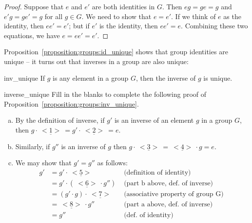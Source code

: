 \begin{proof}
Suppose that $e$ and $e'$ are both identities in $G$. Then $eg = ge =
g$ and $e'g = ge' = g$ for all $g \in G$. We need to show that $e =
e'$. If we think of $e$ as the identity, then $ee' = e'$; but if $e'$
is the identity, then $ee' = e$. Combining these two equations, we
have $e = ee' = e'$. 
\end{proof}
 
 Proposition~\ref{proposition:groups:id_unique} shows that group identities are unique -- it turns out that inverses in a group are also unique:
 
\begin{prop}{inv_unique}
If $g$ is any element in a group $G$, then the inverse of $g$  is unique. 
\end{prop}


\begin{exercise}{inverse_unique}
Fill in the blanks to complete the following proof of Proposition~\ref{proposition:groups:inv_unique}.
\begin{enumerate}[(a)]
\item
By the definition of inverse, if $g'$ is an inverse of an element $g$ in a group $G$, then 
\noindent
$g \cdot \underline{~<1>~} = g' \cdot \underline{~<2>~} = e$.

\item
Similarly, if $g''$ is an inverse of $g$ then  $g \cdot \underline{~<3>~} = \underline{~<4>~} \cdot g = e$. 
\item
We may show that $g' = g''$ as follows:
\begin{align*}
g' & = g' \cdot \underline{~<5>~}  &\text{ (definition of identity) } \\
    & = g' \cdot (\underline{~<6>~} \cdot g'') &\text{ (part b above, def. of inverse) } \\
    & = (g' \cdot g) \cdot \underline{~<7>~}  &\text{ (associative property of group G) } \\
    & = \underline{~<8>~} \cdot g'' &\text{ (part a above, def. of inverse) } \\
    & = g'' &\text{ (def. of identity) }
\end{align*} 
\end{enumerate}
\end{exercise}

